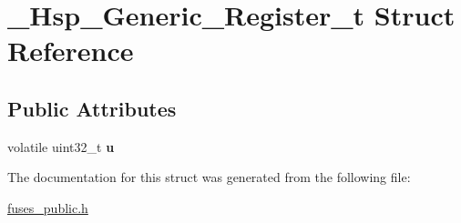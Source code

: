 \hypertarget{struct__Hsp__Generic__Register__t}{\section{\-\_\-\-Hsp\-\_\-\-Generic\-\_\-\-Register\-\_\-t Struct Reference}
\label{struct__Hsp__Generic__Register__t}
}
\subsection*{Public Attributes}
\begin{DoxyCompactItemize}
\item 
\hypertarget{struct__Hsp__Generic__Register__t_a95337f0ab3497e2b67829578cf3e7b4a}{volatile uint32\-\_\-t {\bfseries u}}\label{struct__Hsp__Generic__Register__t_a95337f0ab3497e2b67829578cf3e7b4a}

\end{DoxyCompactItemize}


The documentation for this struct was generated from the following file\-:\begin{DoxyCompactItemize}
\item 
\hyperlink{fuses__public_8h}{fuses\-\_\-public.\-h}\end{DoxyCompactItemize}
